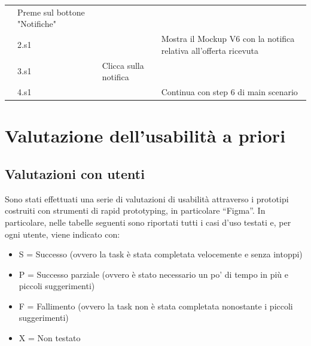 \begin{longtable}{|C{3.0cm}|C{1.3cm}|L{5.2cm}|L{5.2cm}|}
                        & Preme sul bottone "Notifiche"
                        & \\
                        & 2.s1
                        & 
                        & Mostra il Mockup V6 con la notifica relativa all'offerta ricevuta\\
                        & 3.s1
                        & Clicca sulla notifica
                        & \\
                        & 4.s1
                        &
                        & Continua con step 6 di main scenario\\
                \hline
            \end{longtable}

    \newpage

    \section{Valutazione dell’usabilità a priori}
        \subsection{Valutazioni con utenti}
            Sono stati effettuati una serie di valutazioni di usabilità attraverso i prototipi costruiti con strumenti di rapid prototyping, in particolare “Figma”. In particolare, nelle tabelle seguenti sono riportati tutti i casi d'uso testati e, per ogni utente, viene indicato con:
            \begin{itemize}
                \item S = Successo (ovvero la task è stata completata velocemente e senza intoppi)
                \item P = Successo parziale (ovvero è stato necessario un po' di tempo in più e piccoli suggerimenti)
                \item F = Fallimento (ovvero la task non è stata completata nonostante i piccoli suggerimenti)
                \item X = Non testato
            \end{itemize}
        
